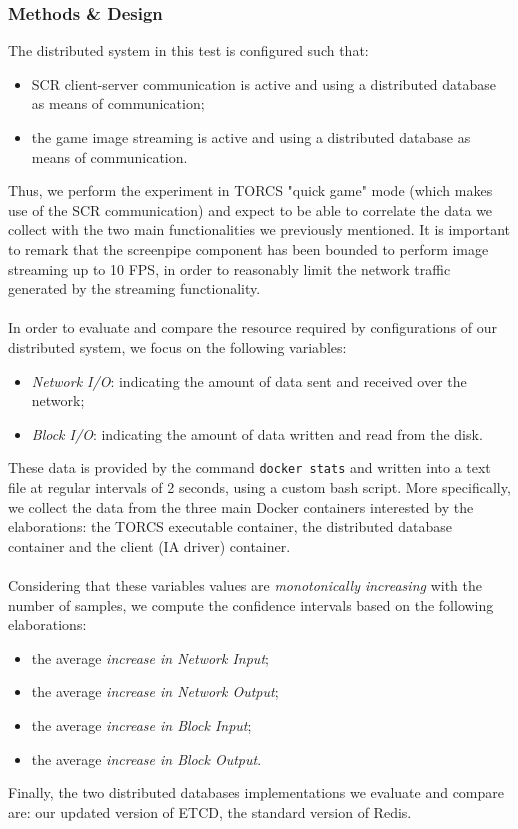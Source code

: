 \subsubsection{Methods \& Design}
The distributed system in this test is configured such that:
\begin{itemize}
	\item SCR client-server communication is active and using a distributed database as means of communication;
	\item the game image streaming is active and using a distributed database as means of communication.
\end{itemize}
Thus, we perform the experiment in TORCS "quick game" mode (which makes use of the SCR communication) and  expect to be able to correlate the data we collect with the two main functionalities we previously mentioned. It is important to remark that the screenpipe component has been bounded to perform image streaming up to 10 FPS, in order to reasonably limit the network traffic generated by the streaming functionality. \\ \\
In order to evaluate and compare the resource required by configurations of our distributed system, we focus on the following variables:
\begin{itemize}
	\item \textit{Network I/O}: indicating the amount of data sent and received over the network;
	\item \textit{Block I/O}: indicating the amount of data written and read from the disk.
\end{itemize}
These data is provided by the command \texttt{docker stats} and written into a text file at regular intervals of 2 seconds, using a custom bash script. More specifically, we collect the data from the three main Docker containers interested by the elaborations: the TORCS executable container, the distributed database container and the client (IA driver) container. \\ \\
Considering that these variables values are \textit{monotonically increasing} with the number of samples, we compute the confidence intervals based on the following elaborations:
\begin{itemize}
	\item the average \textit{increase in Network Input};
	\item the average \textit{increase in Network Output};
	\item the average \textit{increase in Block Input};
	\item the average \textit{increase in Block Output}.
\end{itemize}
Finally, the two distributed databases implementations we evaluate and compare are: our updated version of ETCD, the standard version of Redis.

